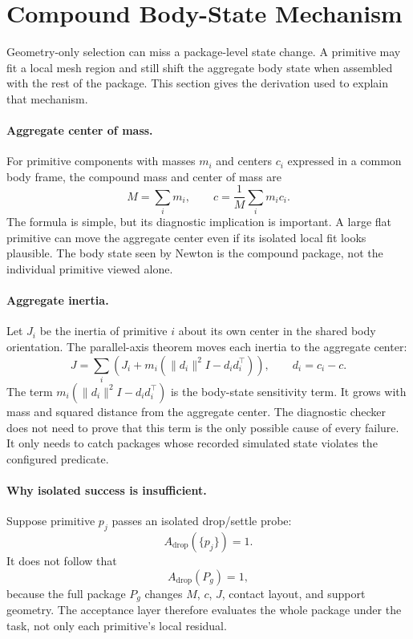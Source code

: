 \section{Compound Body-State Mechanism}

Geometry-only selection can miss a package-level state change. A primitive may fit a local mesh
region and still shift the aggregate body state when assembled with the rest of the package. This
section gives the derivation used to explain that mechanism.

\paragraph{Aggregate center of mass.}
For primitive components with masses $m_i$ and centers $c_i$ expressed in a common body frame, the
compound mass and center of mass are
\[
  M = \sum_i m_i,
  \qquad
  c = \frac{1}{M}\sum_i m_i c_i.
\]
The formula is simple, but its diagnostic implication is important. A large flat primitive can move
the aggregate center even if its isolated local fit looks plausible. The body state seen by Newton
is the compound package, not the individual primitive viewed alone.

\paragraph{Aggregate inertia.}
Let $J_i$ be the inertia of primitive $i$ about its own center in the shared body orientation. The
parallel-axis theorem moves each inertia to the aggregate center:
\[
  J = \sum_i \left(J_i + m_i(\|d_i\|^2 I - d_i d_i^\top)\right),
  \qquad d_i = c_i - c.
\]
The term $m_i(\|d_i\|^2 I - d_i d_i^\top)$ is the body-state sensitivity term. It grows with mass
and squared distance from the aggregate center. The diagnostic checker does not need to prove that
this term is the only possible cause of every failure. It only needs to catch packages whose
recorded simulated state violates the configured predicate.

\paragraph{Why isolated success is insufficient.}
Suppose primitive $p_j$ passes an isolated drop/settle probe:
\[
  A_{\mathrm{drop}}(\{p_j\})=1.
\]
It does not follow that
\[
  A_{\mathrm{drop}}(P_g)=1,
\]
because the full package $P_g$ changes $M$, $c$, $J$, contact layout, and support geometry. The
acceptance layer therefore evaluates the whole package under the task, not only each primitive's
local residual.

